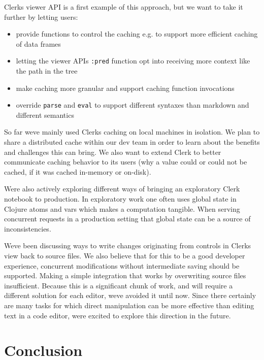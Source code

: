 \documentclass[sigconf,screen]{acmart}
\newcommand{\passthrough}[1]{#1}
\providecommand{\tightlist}{%
  \setlength{\itemsep}{0pt}\setlength{\parskip}{0pt}}
\begin{document}
Clerk\textquotesingle s viewer API is a first example of this approach, but we want to take it further by letting users:

\begin{itemize}
\tightlist
\item
  provide functions to control the caching e.g. to support more efficient caching of data frames
\item
  letting the viewer API\textquotesingle s \passthrough{\lstinline!:pred!} function opt into receiving more context like the path in the tree
\item
  make caching more granular and support caching function invocations
\item
  override \passthrough{\lstinline!parse!} and \passthrough{\lstinline!eval!} to support different syntaxes than markdown and different semantics
\end{itemize}

So far we\textquotesingle ve mainly used Clerk\textquotesingle s caching on local machines in isolation. We plan to share a distributed cache within our dev team in order to learn about the benefits and challenges this can bring. We also want to extend Clerk to better communicate caching behavior to its users (why a value could or could not be cached, if it was cached in-memory or on-disk).

We\textquotesingle re also actively exploring different ways of bringing an exploratory Clerk notebook to production. In exploratory work one often uses global state in Clojure atoms and vars which makes a computation tangible. When serving concurrent requests in a production setting that global state can be a source of inconsistencies.

We\textquotesingle ve been discussing ways to write changes originating from controls in Clerk\textquotesingle s view back to source files. We also believe that for this to be a good developer experience, concurrent modifications without intermediate saving should be supported. Making a simple integration that works by overwriting source files insufficient. Because this is a significant chunk of work, and will require a different solution for each editor, we\textquotesingle ve avoided it until now. Since there certainly are many tasks for which direct manipulation can be more effective than editing text in a code editor, we\textquotesingle re excited to explore this direction in the future.

\hypertarget{conclusion}{%
\section{Conclusion}\label{conclusion}}
\end{document}
